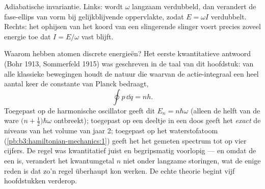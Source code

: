 \begin{omfigure}

{\small Adiabatische invariantie. Links: wordt $\omega$ langzaam
verdubbeld, dan verandert de fase-ellips van vorm bij gelijkblijvende
oppervlakte, zodat $E = \omega I$ verdubbelt. Rechts: het ophijsen van
het koord van een slingerende slinger voert precies zoveel energie toe
dat $I = E/\omega$ vast blijft.}
\end{omfigure}

\begin{remark}\label{rem:b3:hamiltonian-mechanics:old-quantum}
Waarom hebben atomen discrete energieën? Het eerste kwantitatieve
antwoord (Bohr 1913, Sommerfeld 1915) was geschreven in de taal van dit
hoofdstuk: van alle klassieke bewegingen houdt de natuur die waarvan de
actie-integraal een heel aantal keer de constante van Planck bedraagt,
\[
\oint p\,\dd q = nh .
\]
Toegepast op de harmonische oscillator geeft dit $E_n = n\hbar\omega$
(alleen de helft van de ware $\big(n + \tfrac12\big)\hbar
\omega$
ontbreekt); toegepast op een deeltje in een doos geeft het \emph{exact}
de niveaus van het volume van jaar 2; toegepast op het waterstofatoom
(\cref{pb:b3:hamiltonian-mechanics:1}) geeft het het gemeten spectrum tot
op vier cijfers. De regel was kwantitatief juist en begripsmatig
voorlopig --- en omdat de  een  is, verandert
het kwantumgetal $n$ niet onder langzame storingen, wat de enige reden is
dat zo'n regel überhaupt kon werken. De echte theorie begint vijf
hoofdstukken verderop.
\end{remark}

